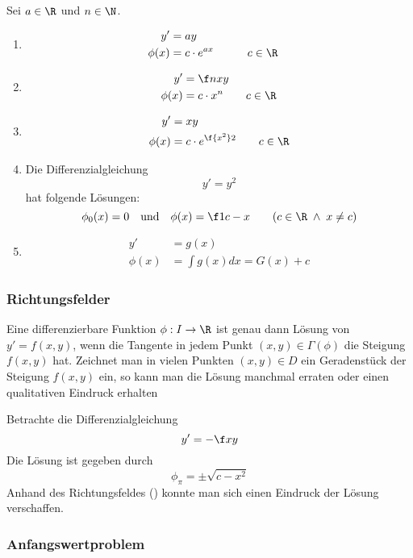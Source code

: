 \documentclass[a4paper,10pt]{scrartcl}
\begin{document}
\begin{ex*}
	Sei $a \in \R$ und $n\in \N$.
	\begin{enumerate}[1)]
		\item
			\begin{alignat*}{3}
				y' &= ay\\ 
  \phi(x) &= c \cdot e^{ax} &&\qquad c\in \R
			\end{alignat*}
		\item
			\begin{align*}
				y' &= \f nx y \\
  \phi(x) &= c \cdot x^n \qquad c\in \R
			\end{align*}
		\item
			\begin{align*}
				y' &= xy \\
		   \phi(x) &= c \cdot e^{\f {x^2}2}  \qquad c\in \R
			\end{align*}
		\item
			Die Differenzialgleichung
			\[
				y' = y^2
			\]
			hat folgende Lösungen:
			\[
				\phi_0(x) = 0 \quad \text{und} \quad \phi(x)= \f 1{c-x} \qquad (c\in \R \;\land\; x\neq c)
			\]
		\item
			\begin{align*}
				y' &= g(x) \\
		   \phi(x) &= \int g(x) dx =  G(x) + c
			\end{align*}
	\end{enumerate}
\end{ex*}

\subsubsection{Richtungsfelder}

Eine differenzierbare Funktion $\phi:I\to \R$ ist genau dann Lösung von $y'=f(x,y)$, wenn die Tangente in jedem Punkt $(x,y)\in \Gamma(\phi)$ die Steigung $f(x,y)$ hat.
Zeichnet man in vielen Punkten $(x,y)\in D$ ein Geradenstück der Steigung $f(x,y)$ ein, so kann man die Lösung manchmal erraten oder einen qualitativen Eindruck erhalten

\begin{ex*}
	Betrachte die Differenzialgleichung
	\[
		y' = -\f xy
	\]
	Die Lösung ist gegeben durch
	\[
		\phi_\pi = \pm\sqrt{c-x^2}
	\]
	Anhand des Richtungsfeldes (\fixme[Graphik]) konnte man sich einen Eindruck der Lösung verschaffen. 
\end{ex*}

\subsubsection{Anfangswertproblem}
\end{document}
